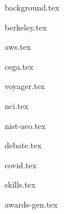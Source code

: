 \documentclass[11pt]{article}
\begin{document}
{background.tex}


{berkeley.tex}


{aws.tex}

{cega.tex}

{voyager.tex}

{nci.tex}

{nist-aeo.tex}


{debate.tex}

{covid.tex}


{skills.tex}


{awards-gen.tex}
\end{document}
